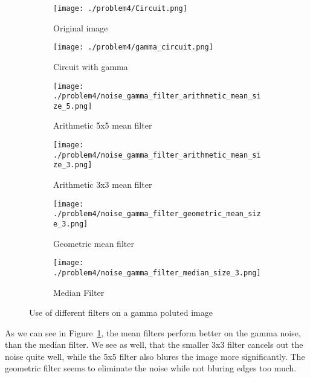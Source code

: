 \documentclass[a4paper]{scrartcl}
\begin{document}
\begin{figure}[H]
    \centering
    \begin{subfigure}[t]{0.4\textwidth}
      \texttt{[image: ./problem4/Circuit.png]}
        \caption{Original image}
    \end{subfigure}
    \begin{subfigure}[t]{0.4\textwidth}
      \texttt{[image: ./problem4/gamma\_circuit.png]}
        \caption{Circuit with gamma}
    \end{subfigure}
    \begin{subfigure}[t]{0.4\textwidth}
      \texttt{[image: ./problem4/noise\_gamma\_filter\_arithmetic\_mean\_size\_5.png]}
        \caption{Arithmetic 5x5 mean filter}
    \end{subfigure}
    \begin{subfigure}[t]{0.4\textwidth}
      \texttt{[image: ./problem4/noise\_gamma\_filter\_arithmetic\_mean\_size\_3.png]}
        \caption{Arithmetic 3x3 mean filter}
    \end{subfigure}
    \begin{subfigure}[t]{0.4\textwidth}
      \texttt{[image: ./problem4/noise\_gamma\_filter\_geometric\_mean\_size\_3.png]}
        \caption{Geometric mean filter}
    \end{subfigure}
    \begin{subfigure}[t]{0.4\textwidth}
      \texttt{[image: ./problem4/noise\_gamma\_filter\_median\_size\_3.png]}
        \caption{Median Filter}
    \end{subfigure}

    \caption{Use of different filters on a gamma poluted image}
    \label{fig:circuitgamma}
\end{figure}

As we can see in Figure~\ref{fig:circuitgamma}, the mean filters perform better on the gamma noise, than the median filter. We see as well, that the smaller 3x3 filter cancels out the noise quite well, while the 5x5 filter also blures the image more significantly. The geometric filter seems to eliminate the noise while not bluring edges too much.
\end{document}
